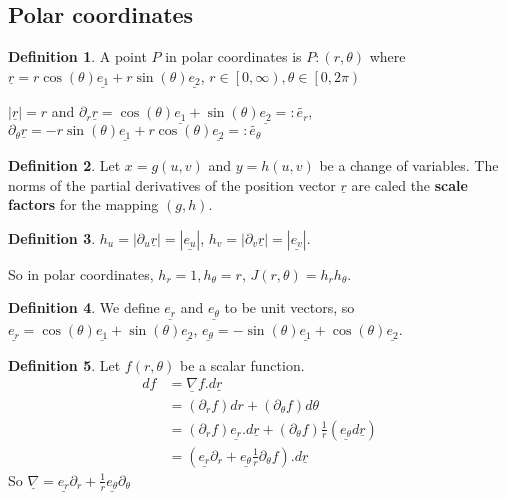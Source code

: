 \documentclass[12pt,a4paper]{article}
\theoremstyle{definition}
\newtheorem{definition}{Definition}[subsection]
\begin{document}
\subsection{Polar coordinates}

\begin{definition}
	A point $P$ in polar coordinates is $P: (r, \theta)$ where $\underline{r} = r \cos (\theta) \underline{e_1} + r \sin (\theta) \underline{e_2}$, $r \in \left[0, \infty\right), \theta \in \left[ 0, 2 \pi \right)$

	$|\underline{r}| = r$ and $\partial_r \underline{r} = \cos(\theta) \underline{e_1} + \sin(\theta) \underline{e_2} =: \tilde{e_r}$, $\partial_{\theta} \underline{r} = - r \sin(\theta) \underline{e_1} + r \cos(\theta) \underline{e_2} =: \tilde{e_{\theta}}$
\end{definition}

\begin{definition}
	Let $x = g(u, v)$ and $y = h(u, v)$ be a change of variables. The norms of the partial derivatives of the position vector $\underline{r}$ are caled the \textbf{scale factors} for the mapping $(g, h)$.
\end{definition}

\begin{definition}
	$h_u = |\partial_u \underline{r}| = |\underline{e_u}|$, $h_v = |\partial_v \underline{r}| = |\underline{e_v}|$.

	So in polar coordinates, $h_r = 1, h_{\theta} = r$, $J(r, \theta) = h_r h_{\theta}$.
\end{definition}

\begin{definition}
	We define $\underline{e_r}$ and $\underline{e_{\theta}}$ to be unit vectors, so $\underline{e_r} = \cos(\theta) \underline{e_1} + \sin(\theta) \underline{e_2}$, $\underline{e_{\theta}} = -\sin(\theta) \underline{e_1} + \cos(\theta) \underline{e_2}$.
\end{definition}

\begin{definition}
	Let $f(r, \theta)$ be a scalar function.
	\[
		\begin{aligned}
			df
				& = \underline{\nabla} f . d \underline{r} \\
				& = (\partial_r f) dr + (\partial_{\theta} f) d \theta \\
				& = (\partial_r f) \underline{e_r} . d\underline{r} + (\partial_{\theta} f) \frac{1}{r} (\underline{e_{\theta}} d \underline{r}) \\
				& = (\underline{e_r} \partial_r + \underline{e_{\theta}} \frac{1}{r} \partial_{\theta} f) . d\underline{r}
		\end{aligned}
	\]
	So $\underline{\nabla} = \underline{e_r} \partial_r + \frac{1}{r} \underline{e_{\theta}} \partial_{\theta}$
\end{definition}
\end{document}
